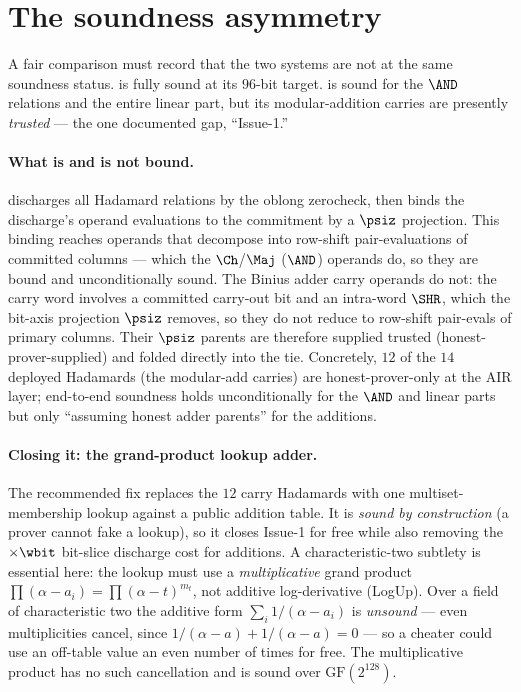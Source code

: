 \section{The soundness asymmetry}
\label{sec:cmp-soundness}

A fair comparison must record that the two systems are not at the same
soundness status. \binius{} is fully sound at its $96$-bit target. \zinc{}
is sound for the $\AND$ relations and the entire linear part, but its
modular-addition carries are presently \emph{trusted} --- the one
documented gap, ``Issue-1.''

\paragraph{What is and is not bound.} \zinc{} discharges all Hadamard
relations by the oblong zerocheck, then binds the discharge's operand
evaluations to the commitment by a $\psiz$ projection. This binding
reaches operands that decompose into row-shift pair-evaluations of
committed columns --- which the $\Ch$/$\Maj$ ($\AND$) operands do, so they
are bound and unconditionally sound. The Binius adder carry operands do
not: the carry word involves a committed carry-out bit and an intra-word
$\SHR$, which the bit-axis projection $\psiz$ removes, so they do not
reduce to row-shift pair-evals of primary columns. Their $\psiz$ parents
are therefore supplied trusted (honest-prover-supplied) and folded
directly into the tie. Concretely, $12$ of the $14$ deployed Hadamards
(the modular-add carries) are honest-prover-only at the AIR layer;
end-to-end soundness holds unconditionally for the $\AND$ and linear
parts but only ``assuming honest adder parents'' for the additions.

\paragraph{Closing it: the grand-product lookup adder.} The recommended
fix replaces the $12$ carry Hadamards with one multiset-membership lookup
against a public addition table. It is \emph{sound by construction} (a
prover cannot fake a lookup), so it closes Issue-1 for free while also
removing the $\times\wbit$ bit-slice discharge cost for additions. A
characteristic-two subtlety is essential here: the lookup must use a
\emph{multiplicative} grand product $\prod(\alpha - a_i) = \prod(\alpha -
t)^{m_t}$, not additive log-derivative (LogUp). Over a field of
characteristic two the additive form $\sum_i 1/(\alpha - a_i)$ is
\emph{unsound} --- even multiplicities cancel, since $1/(\alpha-a) +
1/(\alpha-a) = 0$ --- so a cheater could use an off-table value an even
number of times for free. The multiplicative product has no such
cancellation and is sound over $\mathrm{GF}(2^{128})$.

